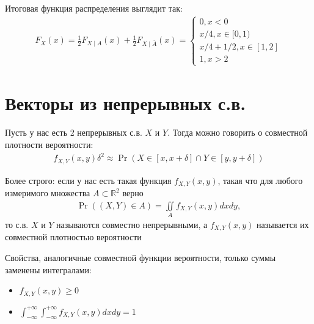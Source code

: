 \documentclass[12pt]{article}
\newcommand\R{\mathbb{R}}
\begin{document}
Итоговая функция распределения выглядит так:
\begin{align*}
  F_X(x) = \frac{1}{2}F_{X \mid A}(x) + \frac{1}{2} F_{X \mid \bar A}(x) = \begin{cases}
    0, x < 0 \\
    x/4, x \in [0, 1) \\
    x/4 + 1/2, x \in [1, 2] \\
    1, x > 2
  \end{cases}
\end{align*}
\begin{center}
\end{center}

\section{Векторы из непрерывных с.в.}

Пусть у нас есть 2 непрерывных с.в. $X$ и $Y$. Тогда можно говорить о совместной плотности вероятности:
\begin{align*}
  f_{X, Y}(x, y) \delta^2 \approx \Pr(X \in [x, x + \delta] \cap Y \in [y, y + \delta])
\end{align*}

Более строго: если у нас есть такая функция $f_{X ,Y}(x ,y)$, такая что для любого измеримого множества $A \subset \R^2$ верно
\begin{align*}
  \Pr((X, Y) \in A) = \iint\limits_A f_{X, Y}(x, y) dx dy,
\end{align*} 
то с.в. $X$ и $Y$ называются совместно непрерывными, а $f_{X, Y}(x, y)$ называется их совместной плотностью вероятности 

Свойства, аналогичные совместной функции вероятности, только суммы заменены интегралами:

\begin{itemize}
  \item $f_{X, Y}(x, y) \ge 0$
  \item $\int_{-\infty}^{+\infty}\int_{-\infty}^{+\infty}  f_{X, Y}(x, y) dx dy = 1$
\end{itemize}
\end{document}
